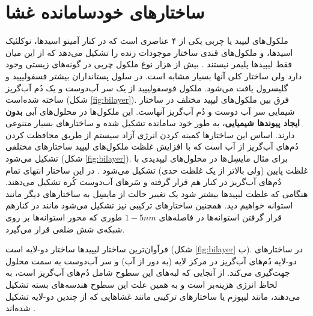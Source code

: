 \setRL
\section{
ساختارهای خودسامانده غشا
}
 
ملکول‌های لیپید یا چربی یکی از ۴ عناصری است که در کنار آمینو اسید‌ها، نوکلئیک اسید‌ها، و ملکول‌های قندی ساختار موجودات زنده را تشکیل می‌دهد که از این میان فقط لیپید‌ها پلیمر نیستند
\cite{Membraneasamatteroffat}. بیش از هزار نوع ملکول چربی در گونه‌های زیستی وجود دارد ولی ساختار کلی آنها بسیار مشابه است. در سلول‌ پستانداران بیشتر فسفولیپید و گلیسرول یافت می‌شود. ملکول‌ فوسفولیپید از یک سر آب‌دوست  
 و یک دُم آب‌گریز  
 ساخته شده‌است (شکل
\ref{fig:bilayer}). فرق بین ملکول‌های لیپید مختلف در ساختار شیمایی سر آب دوست و دُم آب‌گریز آنهاست. این ملکول‌ها در محلول‌های آبی
\textbf{بدون ایجاد پیوندها شیمیایی}، به طور خود سامانده  
 تشکیل شده و ساختار‌های بسیار متنوعی دارند. اساس این ساختار‌ها کمینه کردن انرژی آزاد سیستم از طریق محافظت کردن دُم‌های آب‌گریز از آب است که با افزایش غلظت ملکول‌های لیپید ساختار‌های مختلفی تشکیل می‌شود
 (شکل
\ref{fig:bilayer}). برای مثال مایسِل‌ها
 در محلول‌های لیپدیدی با غلظت‌ پایین (ولی بالاتر از یک غلظت حدی) تشکیل می‌شود
 \cite{Lipowskyb1995ook}. در این ساختار انتهای تمام دُم‌های آب‌گریز در کنار هم قرار گرفته و سَر‌های آب‌دوست کُره تشکیل می‌دهند. هنگامی‌ که غلظت لیپید‌ها بیشتر شود یک تغییر حالت از مایسِل به ساختارهای دیگر مانند استوانه خواهیم دید. همچنین ساختار‌های ترکیبی نیز تشکیل می‌شود مانند در کنارهم قرار گرفتن استوانه‌ها در فاصله‌های
  $1-5nm$
طوری که محور استوانه‌ها بر روی شبکه‌ی شش ضلعی قرار می‌گیرد. 
 
 فرآوان‌ترین ساختار لیپید‌ها ساختار دو-لایه ‌است (شکل
 \ref{fig:bilayer}
 ب).  در ساختار‌های دو-لایه دُم‌های  آب‌گریز در مرکز لایه (به دور از آب) و سر آب‌دوست به سمت محلول جهت‌گیری می‌کند. از آنجایی که لبه‌های این سطوح شامل دُم‌های آب‌گریز است، به لحاظ انرژی هزینه‌بر است و به همین علت این سطوح هندسه‌های بسته تشکیل می‌دهند، مانند لیپوزم
 یا ساختار‌های ترکیبی مانند غشا‌هایی که از چندین دو-لایه تشکیل شده‌اند
\cite{LifeAsaMatterofFat2005}.

